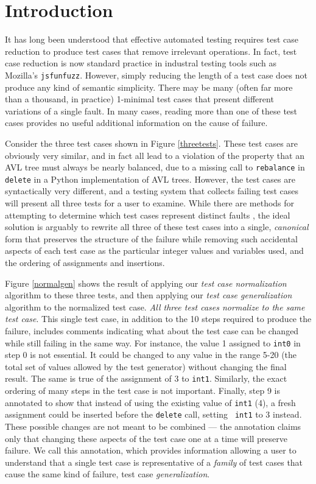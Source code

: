 \section{Introduction}

It has long been understood that effective automated testing requires
test case reduction \cite{DD,MinUnit,ICSEDiff} to produce test cases
that remove irrelevant operations.  In fact, test case reduction is
now standard practice in industral testing tools such as Mozilla's
{\tt jsfunfuzz}.  However, simply reducing the length of a test case
does not produce any kind of semantic simplicity.  There may be many
(often far more than a thousand, in practice) 1-minimal test cases
that present different variations of a single fault.  In many cases,
reading more than one of these test cases provides no useful
additional information on the cause of failure.

Consider the three test cases shown in Figure \ref{threetests}.  These
test cases are obviously very similar, and in fact all lead to a
violation of the property that an AVL tree must always be nearly
balanced, due to a missing call to {\tt rebalance} in {\tt delete} in
a Python implementation of AVL trees.  However, the test cases are
syntactically very different, and a testing system that collects
failing test cases will present all three tests for a user to examine.
While there are methods for attempting to determine which test cases
represent distinct faults \cite{PLDI13}, the ideal solution is
arguably to rewrite all three of these test cases into a single,
\emph{canonical} form that preserves the structure of the failure while removing
such accidental aspects of each test case as the particular integer
values and variables used, and the ordering of assignments and
insertions.

Figure \ref{normalgen} shows the result of applying our \emph{test case
  normalization} algorithm to these three tests, and then applying our
\emph{test case generalization} algorithm to the normalized test case.
\emph{All three test cases normalize to the same test
case}.  This single test case, in addition to the 10 steps required to produce
the failure, includes comments indicating what about the test case can
be changed while still failing in the same way.  For instance, the
value 1 assigned to {\tt int0} in step 0 is not essential.  It could
be changed to any value in the range 5-20 (the total set of values
allowed by the test generator) without changing the final result.  The
same is true of the assignment of 3 to {\tt int1}.  Similarly, the
exact ordering of many steps in the test case is not important.  Finally,
step 9 is annotated to show that instead of using the existing value
of {\tt int1} (4), a fresh assignment could be inserted before the
{\tt delete} call, setting {\tt
  int1} to 3 instead.  These possible
changes are not meant to be combined --- the annotation claims only
that changing these aspects of the test case one at a time will
preserve failure.  We call this annotation, which provides information
allowing a user to understand that a single test case is
representative of a \emph{family} of test cases that cause the same
kind of failure, test case \emph{generalization}.

